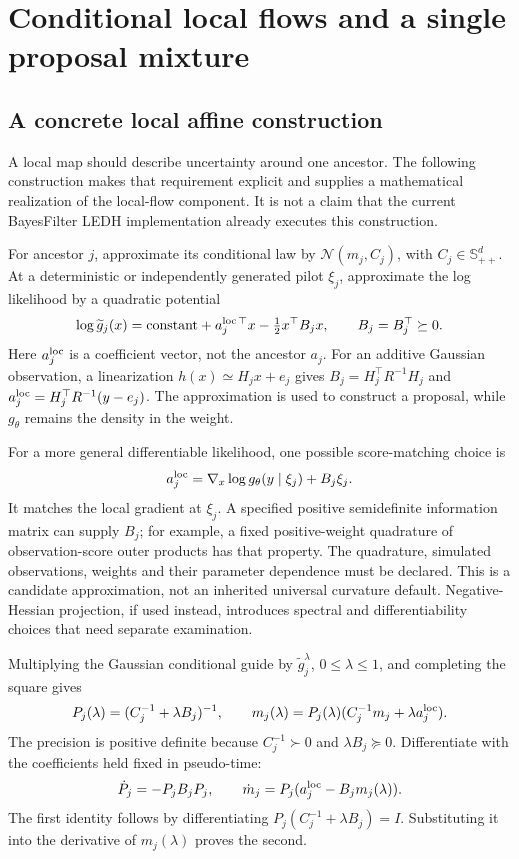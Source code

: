 \documentclass[11pt,a4paper]{article}
\newcommand{\Ncal}{\mathcal N}
\newcommand{\SPD}{\mathbb S_{++}}
\begin{document}
\section{Conditional local flows and a single proposal mixture}

\subsection{A concrete local affine construction}

A local map should describe uncertainty around one ancestor. The following
construction makes that requirement explicit and supplies a mathematical
realization of the local-flow component. It is not a claim that the current
BayesFilter LEDH implementation already executes this construction.

For ancestor \(j\), approximate its conditional law by
\(\Ncal(m_j,C_j)\), with \(C_j\in\SPD^d\).
At a deterministic or independently generated pilot \(\xi_j\), approximate
the log likelihood by a quadratic potential
\begin{equation}
\label{eq:quadratic-guide}
 \log \widetilde g_j(x)
 =\mathrm{constant}+a_j^{\rm loc\,\top}x-\tfrac12x^\top B_jx,
 \qquad B_j=B_j^\top\succeq0 .
\end{equation}
Here \(a_j^{\rm loc}\) is a coefficient vector, not the ancestor \(a_j\).
For an additive Gaussian observation, a linearization
\(h(x)\simeq H_jx+e_j\) gives
\(B_j=H_j^\top R^{-1}H_j\) and
\(a_j^{\rm loc}=H_j^\top R^{-1}(y-e_j)\).
The approximation is used to construct a proposal, while \(g_\theta\)
remains the density in the weight.

For a more general differentiable likelihood, one possible score-matching
choice is
\[
 a_j^{\rm loc}
 =\nabla_x\log g_\theta(y\mid \xi_j)+B_j\xi_j .
\]
It matches the local gradient at \(\xi_j\). A specified positive
semidefinite information matrix can supply \(B_j\); for example, a fixed
positive-weight quadrature of observation-score outer products has that
property. The quadrature, simulated observations, weights and their
parameter dependence must be declared. This is a candidate approximation,
not an inherited universal curvature default. Negative-Hessian projection,
if used instead, introduces spectral and differentiability choices that
need separate examination.

Multiplying the Gaussian conditional guide by
\(\widetilde g_j^\lambda\), \(0\leq\lambda\leq1\), and completing the
square gives
\begin{equation}
\label{eq:bridge-moments}
 P_j(\lambda)=(C_j^{-1}+\lambda B_j)^{-1},\qquad
 m_j(\lambda)=P_j(\lambda)
       (C_j^{-1}m_j+\lambda a_j^{\rm loc}).
\end{equation}
The precision is positive definite because \(C_j^{-1}\succ0\) and
\(\lambda B_j\succeq0\). Differentiate with the coefficients held fixed
in pseudo-time:
\begin{equation}
\label{eq:bridge-derivatives}
 \dot P_j=-P_jB_jP_j,\qquad
 \dot m_j=P_j(a_j^{\rm loc}-B_jm_j(\lambda)).
\end{equation}
The first identity follows by differentiating
\(P_j(C_j^{-1}+\lambda B_j)=I\). Substituting it into the derivative
of \(m_j(\lambda)\) proves the second.
\end{document}
